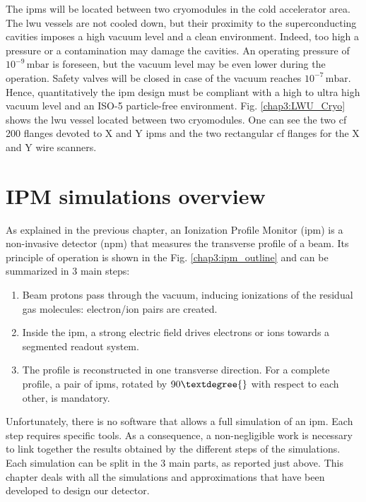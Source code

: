 \begin{refsection}
  The \acrshort{ipm}s will be located between two cryomodules in the cold accelerator area. The \acrshort{lwu} vessels are not cooled down, but their proximity to the superconducting cavities imposes a high vacuum level and a clean environment. Indeed, too high a pressure or a contamination may damage the cavities. An operating pressure of \(10^{-9}\,\mathrm{mbar}\) is foreseen, but the vacuum level may be even lower during the operation. Safety valves will be closed in case of the vacuum reaches \(10^{-7}\,\mathrm{mbar}\). Hence, quantitatively the \acrshort{ipm} design must be compliant with a high to ultra high vacuum level and an ISO-5 \cite{ISO14644} particle-free environment. Fig. \ref{chap3:LWU_Cryo} shows the \acrshort{lwu} vessel located between two cryomodules. One can see the two \acrshort{cf} 200 flanges devoted to X and Y \acrshort{ipm}s and the two rectangular \acrshort{cf} flanges for the X and Y wire scanners.

  \section{IPM simulations overview}

  

  As explained in the previous chapter, an Ionization Profile Monitor (\acrshort{ipm}) is a non-invasive detector (\acrshort{npm}) that measures the transverse profile of a beam.
  Its principle of operation is shown in the Fig. \ref{chap3:ipm_outline} and can be summarized in 3 main steps:
  \begin{enumerate}
    \item Beam protons pass through the vacuum, inducing ionizations of the residual gas molecules: electron/ion pairs are created.
    \item Inside the \acrshort{ipm}, a strong electric field drives electrons or ions towards a segmented readout system.
    \item The profile is reconstructed in one transverse direction. For a complete profile, a pair of \acrshort{ipm}s, rotated by $90\textdegree{}$ with respect to each other, is mandatory.
  \end{enumerate}

  Unfortunately, there is no software that allows a full simulation of an \acrshort{ipm}. Each step requires specific tools. As a consequence, a non-negligible work is necessary to link together the results obtained by the different steps of the simulations. Each simulation can be split in the 3 main parts, as reported just above. This chapter deals with all the simulations and approximations that have been developed to design our detector.


\end{refsection}
